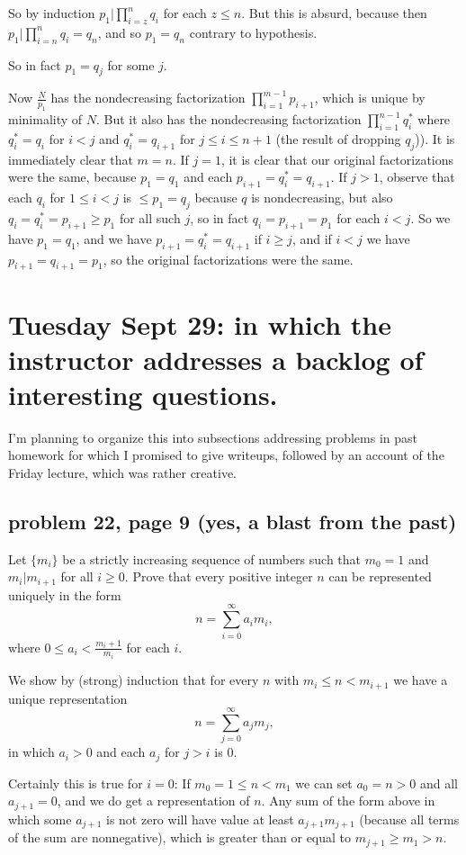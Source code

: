 \documentclass[12pt]{article}
\begin{document}
So by induction $p_1 | \prod_{i=z}^nq_i$ for each $z\leq n$.  But this is absurd, because then $p_1 | \prod_{i=n}^nq_i=q_n$, and so $p_1=q_n$ contrary to hypothesis.

So in fact $p_1=q_j$ for some $j$.

Now $\frac N{p_1}$ has the nondecreasing factorization $\prod_{i=1}^{m-1}p_{i+1}$, which is unique by minimality of $N$.  But it also has the nondecreasing factorization
$\prod_{i=1}^{n-1}q^*_i$ where $q^*_i = q_i$ for $i<j$ and $q^*_i = q_{i+1}$ for $j \leq i \leq n+1$ (the result of dropping $q_j$)).  It is immediately clear that $m=n$.  If $j=1$, it is clear that our original factorizations were the same, because $p_1=q_1$ and each $p_{i+1}=q^*_i=q_{i+1}$.  If $j>1$, observe that each $q_i$ for $1\leq  i < j$ is $\leq p_1=q_j$ because $q$ is nondecreasing, but also $q_i = q^*_i = p_{i+1} \geq p_1$ for all such $j$, so in fact $q_i = p_{i+1}=p_1$ for each $i<j$.  So we have $p_1 = q_1$, and we have
$p_{i+1}= q^*_i = q_{i+1}$ if $i \geq j$, and if $i<j$ we have $p_{i+1}=q_{i+1}=p_1$, so the original factorizations were the same.

\section{Tuesday Sept 29:  in which the instructor addresses a backlog of interesting questions.}

I'm planning to organize this into subsections addressing problems in past homework for which I promised to give writeups, followed by an account of the Friday lecture, which was rather creative.

\subsection{problem 22, page 9 (yes, a blast from the past)}
Let $\{m_i\}$ be a strictly increasing sequence of numbers such that $m_0=1$ and $m_i | m_{i+1}$ for all $i \geq 0$.  Prove that every positive integer $n$ can be represented uniquely in the form 
$$n = \sum_{i=0}^\infty a_im_i,$$ where $0 \leq a_i < \frac{m_i+1}{m_i}$ for each $i$.

We show by (strong) induction that for every $n$ with $m_{i}\leq n <m_{i+1}$ we have a unique representation $$n = \sum_{j=0}^\infty a_jm_j,$$ in which $a_i>0$ and each $a_j$ for $j>i$ is 0.

Certainly this is true for $i=0$:  If $m_0=1 \leq n<m_1$ we can set $a_0 = n>0$ and all $a_{j+1}=0$, and we do get a representation of $n$.  Any sum of the form above in which
some $a_{j+1}$ is not zero will have value at least $a_{j+1}m_{j+1}$ (because all terms of the sum are nonnegative), which is greater than or equal to $m_{j+1}\geq m_1>n$.
\end{document}
